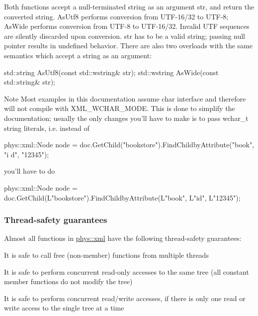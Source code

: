  Both functions accept a null-\/terminated string as an argument str, and return the converted string. AsUtf8 performs conversion from UTF-\/16/32 to UTF-\/8; AsWide performs conversion from UTF-\/8 to UTF-\/16/32. Invalid UTF sequences are silently discarded upon conversion. str has to be a valid string; passing null pointer results in undefined behavior. There are also two overloads with the same semantics which accept a string as an argument: 
\begin{DoxyCode}
 std::string AsUtf8(const std::wstring& str);
 std::wstring AsWide(const std::string& str);
\end{DoxyCode}
 \begin{DoxyNote}{Note}
Most examples in this documentation assume char interface and therefore will not compile with XML\_\-WCHAR\_\-MODE. This is done to simplify the documentation; usually the only changes you'll have to make is to pass wchar\_\-t string literals, i.e. instead of \par
 \par
 
\begin{DoxyCode}
 phys::xml::Node node = doc.GetChild("bookstore").FindChildbyAttribute("book", "i
      d", "12345"); 
\end{DoxyCode}
 \par
 \par
 you'll have to do \par
 \par
 
\begin{DoxyCode}
 phys::xml::Node node = doc.GetChild(L"bookstore").FindChildbyAttribute(L"book", 
      L"id", L"12345"); 
\end{DoxyCode}

\end{DoxyNote}
\hypertarget{XMLManual_XMLThreadSafety}{}\subsubsection{Thread-\/safety guarantees}\label{XMLManual_XMLThreadSafety}
Almost all functions in \hyperlink{namespacephys_1_1xml}{phys::xml} have the following thread-\/safety guarantees:
\begin{DoxyItemize}
\item It is safe to call free (non-\/member) functions from multiple threads
\item It is safe to perform concurrent read-\/only accesses to the same tree (all constant member functions do not modify the tree)
\item It is safe to perform concurrent read/write accesses, if there is only one read or write access to the single tree at a time
\end{DoxyItemize}

